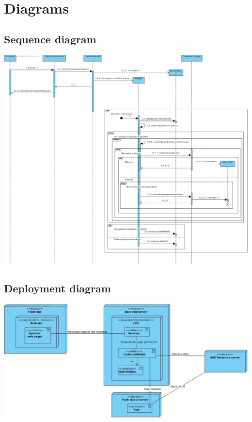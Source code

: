\section{Diagrams}

\subsection{Sequence diagram}

\includegraphics[scale=0.35]{report/images/SequenceDiagram.jpg}

\subsection{Deployment diagram}

\includegraphics[scale=0.4]{report/images/DeploymentDiagram.jpg}